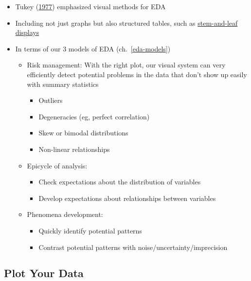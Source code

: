 \documentclass[
]{article}
\providecommand{\tightlist}{%
  \setlength{\itemsep}{0pt}\setlength{\parskip}{0pt}}
\begin{document}
\begin{itemize}
\item
  Tukey (\protect\hyperlink{ref-TukeyExploratoryDataAnalysis1977}{1977}) emphasized visual methods for EDA
\item
  Including not just graphs but also structured tables, such as \href{https://en.wikipedia.org/wiki/Stem-and-leaf_display}{stem-and-leaf displays}
\item
  In terms of our 3 models of EDA (ch.~\ref{eda-models})

  \begin{itemize}
  \tightlist
  \item
    Risk management: With the right plot, our visual system can very efficiently detect potential problems in the data that don't show up easily with summary statistics

    \begin{itemize}
    \tightlist
    \item
      Outliers
    \item
      Degeneracies (eg, perfect correlation)
    \item
      Skew or bimodal distributions
    \item
      Non-linear relationships
    \end{itemize}
  \item
    Epicycle of analysis:

    \begin{itemize}
    \tightlist
    \item
      Check expectations about the distribution of variables
    \item
      Develop expectations about relationships between variables
    \end{itemize}
  \item
    Phenomena development:

    \begin{itemize}
    \tightlist
    \item
      Quickly identify potential patterns
    \item
      Contrast potential patterns with noise/uncertainty/imprecision
    \end{itemize}
  \end{itemize}
\end{itemize}

\hypertarget{plot-your-data}{%
\subsection{Plot Your Data}\label{plot-your-data}}
\end{document}
